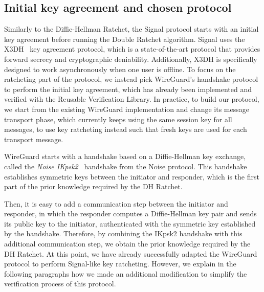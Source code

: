 \subsection{Initial key agreement and chosen protocol}
\label{sec:chosen-protocol}

Similarly to the Diffie-Hellman Ratchet, the Signal protocol starts with an initial key agreement before running the Double Ratchet algorithm.
Signal uses the X3DH~\cite{marlinspike2016x3dh} key agreement protocol, which is a state-of-the-art protocol that provides forward secrecy and cryptographic deniability.
Additionally, X3DH is specifically designed to work asynchronously when one user is offline.
To focus on the ratcheting part of the protocol, we instead pick WireGuard's handshake protocol to perform the initial key agreement, which has already been implemented and verified with the Reusable Verification Library.
In practice, to build our protocol, we start from the existing WireGuard implementation and change its message transport phase, which currently keeps using the same session key for all messages, to use key ratcheting instead such that fresh keys are used for each transport message.

WireGuard starts with a handshake based on a Diffie-Hellman key exchange, called the \emph{Noise IKpsk2}~\cite{perrin2018noise} handshake from the Noise protocol. This handshake establishes symmetric keys between the initiator and responder, which is the first part of the prior knowledge required by the DH Ratchet.

Then, it is easy to add a communication step between the initiator and responder, in which the responder computes a Diffie-Hellman key pair and sends its public key to the initiator, authenticated with the symmetric key established by the handshake.
Therefore, by combining the IKpsk2 handshake with this additional communication step, we obtain the prior knowledge required by the DH Ratchet.
At this point, we have already successfully adapted the WireGuard protocol to perform Signal-like key ratcheting.
However, we explain in the following paragraphs how we made an additional modification to simplify the verification process of this protocol.

